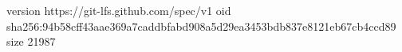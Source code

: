 version https://git-lfs.github.com/spec/v1
oid sha256:94b58cff43aae369a7caddbfabd908a5d29ea3453bdb837e8121eb67cb4ccd89
size 21987
